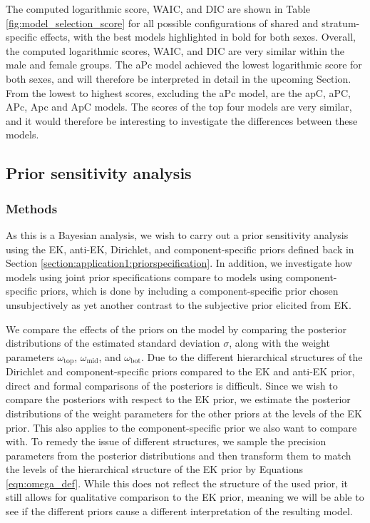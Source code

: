 

The computed logarithmic score, WAIC, and DIC are shown in Table \ref{fig:model_selection_score} for all possible configurations of shared and stratum-specific effects, with the best models highlighted in bold for both sexes. Overall, the computed logarithmic scores, WAIC, and DIC are very similar within the male and female groups. The aPc model achieved the lowest logarithmic score for both sexes, and will therefore be interpreted in detail in the upcoming Section. From the lowest to highest scores, excluding the aPc model, are the apC, aPC, APc, Apc and ApC models. The scores of the top four models are very similar, and it would therefore be interesting to investigate the differences between these models.

\FloatBarrier
\subsection{Prior sensitivity analysis}
\label{section:application1:prior-sens}
\subsubsection{Methods}
\label{section:application1:prior-sens-motiv}
As this is a Bayesian analysis, we wish to carry out a prior sensitivity analysis using the EK, anti-EK, Dirichlet, and component-specific priors defined back in Section \ref{section:application1:priorspecification}. In addition, we investigate how models using joint prior specifications compare to models using component-specific priors, which is done by including a component-specific prior chosen unsubjectively as yet another contrast to the subjective prior elicited from EK.

We compare the effects of the priors on the model by comparing the posterior distributions of the estimated standard deviation $\sigma$, along with the weight parameters $\omega_{\text{top}}$, $\omega_{\text{mid}}$, and $\omega_{\text{bot}}$. Due to the different hierarchical structures of the Dirichlet and component-specific priors compared to the EK and anti-EK prior, direct and formal comparisons of the posteriors is difficult. Since we wish to compare the posteriors with respect to the EK prior, we estimate the posterior distributions of the weight parameters for the other priors at the levels of the EK prior. This also applies to the component-specific prior we also want to compare with. To remedy the issue of different structures, we sample the precision parameters from the posterior distributions and then transform them to match the levels of the hierarchical structure of the EK prior by Equations \eqref{eqn:omega_def}. While this does not reflect the structure of the used prior, it still allows for qualitative comparison to the EK prior, meaning we will be able to see if the different priors cause a different interpretation of the resulting model.

